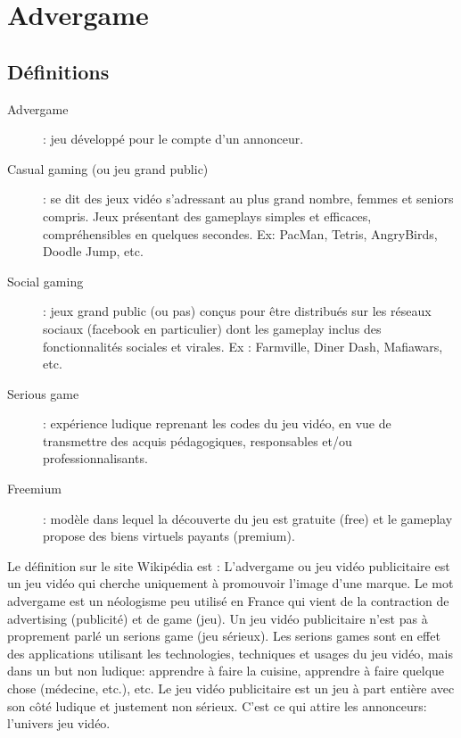 
\section{Advergame} %

\subsection{Définitions} %

\begin{description}  \item[Advergame] : jeu développé pour le compte d’un annonceur.

\item[Casual gaming (ou jeu grand public)] : se dit des jeux vidéo s'adressant au plus grand nombre, femmes et seniors compris. Jeux présentant des gameplays simples et efficaces, compréhensibles en quelques secondes. Ex: PacMan, Tetris, AngryBirds, Doodle Jump, etc.

\item[Social gaming] : jeux grand public (ou pas) conçus pour être distribués sur les réseaux sociaux (facebook en particulier) dont les gameplay inclus des fonctionnalités sociales et virales. Ex : Farmville, Diner Dash, Mafiawars, etc.

\item[Serious game] : expérience ludique reprenant les codes du jeu vidéo, en vue de transmettre des acquis pédagogiques, responsables et/ou professionnalisants.

\item[Freemium] : modèle dans lequel la découverte du jeu est gratuite (free) et le gameplay propose des biens virtuels payants (premium).
\end{description}
Le définition sur le site Wikipédia est : L'advergame ou jeu vidéo publicitaire est un jeu vidéo qui cherche uniquement à promouvoir l'image d'une marque. Le mot advergame est un néologisme peu utilisé en France qui vient de la contraction de advertising (publicité) et de game (jeu). Un jeu vidéo publicitaire n'est pas à proprement parlé un serions game (jeu sérieux). Les serions games sont en effet des applications utilisant les technologies, techniques et usages du jeu vidéo, mais dans un but non ludique: apprendre à faire la cuisine, apprendre à faire quelque chose (médecine, etc.), etc.
Le jeu vidéo publicitaire est un jeu à part entière avec son côté ludique et justement non sérieux. C'est ce qui attire les annonceurs: l'univers jeu vidéo.

